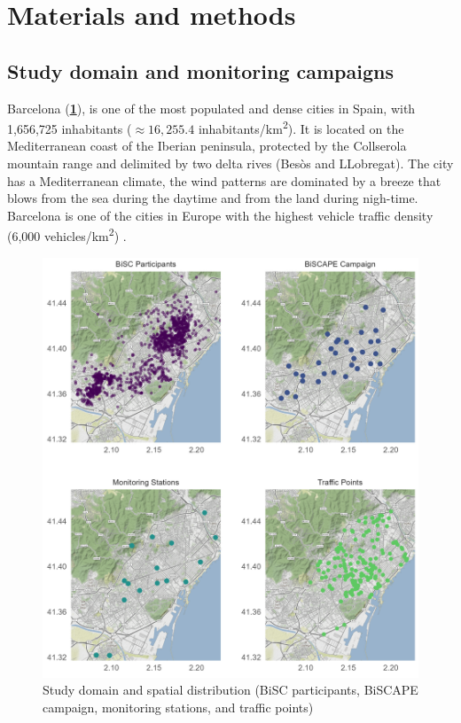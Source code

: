 \documentclass{article}
\begin{document}
\section{Materials and methods}

\subsection{Study domain and monitoring campaigns}

Barcelona (\textbf{\cref{fig1}}), is one of the most populated and dense cities in Spain, with 1,656,725 inhabitants ($\approx16,255.4$ inhabitants/km\textsuperscript{2}). It is located on the Mediterranean coast of the Iberian peninsula, protected by the Collserola mountain range and delimited by two delta rives (Besòs and LLobregat). The city has a Mediterranean climate, the wind patterns are dominated by a breeze that blows from the sea during the daytime and from the land during nigh-time. Barcelona is one of the cities in Europe with the highest vehicle traffic density (6,000 vehicles/km\textsuperscript{2}) \cite{casallas2018}. 

\captionsetup[figure]{skip=-4pt}
\begin{figure}[!htb]
\includegraphics[width=1.0\textwidth]{figures/fig1_op2.png}
\caption{Study domain and spatial distribution (BiSC participants, BiSCAPE campaign, monitoring stations, and traffic points)}
\label{fig1}
\end{figure}
\end{document}
